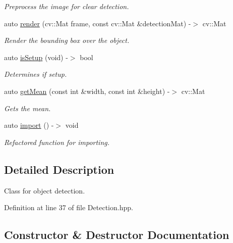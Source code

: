 \begin{DoxyCompactItemize}
\begin{DoxyCompactList}\small\item\em Preprocess the image for clear detection. \end{DoxyCompactList}\item 
auto \hyperlink{class_detection_a1a481a0248acb74cb0df6bcd437783eb}{render} (cv\+::\+Mat frame, const cv\+::\+Mat \&detection\+Mat) -\/$>$ cv\+::\+Mat
\begin{DoxyCompactList}\small\item\em Render the bounding box over the object. \end{DoxyCompactList}\item 
auto \hyperlink{class_detection_a3a657b6943cacfd4bdd55d90def58427}{is\+Setup} (void) -\/$>$ bool
\begin{DoxyCompactList}\small\item\em Determines if setup. \end{DoxyCompactList}\item 
auto \hyperlink{class_detection_a3340560fb1e76bd096478d4c29306130}{get\+Mean} (const int \&width, const int \&height) -\/$>$ cv\+::\+Mat
\begin{DoxyCompactList}\small\item\em Gets the mean. \end{DoxyCompactList}\item 
auto \hyperlink{class_detection_a0f4577baa1334c17054489a3ab8804ba}{import} () -\/$>$ void
\begin{DoxyCompactList}\small\item\em Refactored function for importing. \end{DoxyCompactList}\end{DoxyCompactItemize}


\subsection{Detailed Description}
Class for object detection. 

Definition at line 37 of file Detection.\+hpp.



\subsection{Constructor \& Destructor Documentation}
\mbox{\label{class_detection_a86e6ebf5a660a29e78ee7a7f08292260}} 
